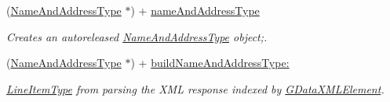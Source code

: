 \begin{DoxyCompactItemize}
(\hyperlink{interface_name_and_address_type}{NameAndAddressType} $\ast$) + \hyperlink{interface_name_and_address_type_a5bde884f28077c4b2228f044e2347634}{nameAndAddressType}
\begin{DoxyCompactList}\small\item\em Creates an autoreleased \hyperlink{interface_name_and_address_type}{NameAndAddressType} object;. \item\end{DoxyCompactList}\item 
(\hyperlink{interface_name_and_address_type}{NameAndAddressType} $\ast$) + \hyperlink{interface_name_and_address_type_aae29be499f2d1a89fbce8e9a0401dfc7}{buildNameAndAddressType:}
\begin{DoxyCompactList}\small\item\em \hyperlink{interface_line_item_type}{LineItemType} from parsing the XML response indexed by \hyperlink{interface_g_data_x_m_l_element}{GDataXMLElement}. \item\end{DoxyCompactList}\end{DoxyCompactItemize}
